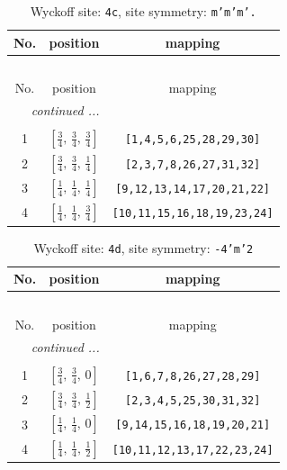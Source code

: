 \documentclass[fleqn,8pt]{jsarticle}
\begin{document}
\renewcommand{\arraystretch}{1.2}
\begin{longtable}{ccc}
\caption{Wyckoff site: {\tt 4c}, site symmetry: {\tt m'm'm'.}}
 \\
 \hline \hline
No. & position & mapping \\ \hline \endfirsthead

\multicolumn{2}{l}{\tablename\ \thetable{}} \\
 \hline \hline
No. & position & mapping \\ \hline \endhead

 \hline \hline
\multicolumn{2}{r}{\footnotesize\it continued ...} \\ \endfoot

 \hline \hline
\multicolumn{2}{r}{} \\ \endlastfoot

1 & $\left[ \frac{3}{4},\, \frac{3}{4},\, \frac{3}{4} \right]$ & {\tt [1,4,5,6,25,28,29,30]} \\ \hline
2 & $\left[ \frac{3}{4},\, \frac{3}{4},\, \frac{1}{4} \right]$ & {\tt [2,3,7,8,26,27,31,32]} \\ \hline
3 & $\left[ \frac{1}{4},\, \frac{1}{4},\, \frac{1}{4} \right]$ & {\tt [9,12,13,14,17,20,21,22]} \\ \hline
4 & $\left[ \frac{1}{4},\, \frac{1}{4},\, \frac{3}{4} \right]$ & {\tt [10,11,15,16,18,19,23,24]} \\
\end{longtable}
\renewcommand{\arraystretch}{1.2}
\begin{longtable}{ccc}
\caption{Wyckoff site: {\tt 4d}, site symmetry: {\tt -4'm'2}}
 \\
 \hline \hline
No. & position & mapping \\ \hline \endfirsthead

\multicolumn{2}{l}{\tablename\ \thetable{}} \\
 \hline \hline
No. & position & mapping \\ \hline \endhead

 \hline \hline
\multicolumn{2}{r}{\footnotesize\it continued ...} \\ \endfoot

 \hline \hline
\multicolumn{2}{r}{} \\ \endlastfoot

1 & $\left[ \frac{3}{4},\, \frac{3}{4},\, 0 \right]$ & {\tt [1,6,7,8,26,27,28,29]} \\ \hline
2 & $\left[ \frac{3}{4},\, \frac{3}{4},\, \frac{1}{2} \right]$ & {\tt [2,3,4,5,25,30,31,32]} \\ \hline
3 & $\left[ \frac{1}{4},\, \frac{1}{4},\, 0 \right]$ & {\tt [9,14,15,16,18,19,20,21]} \\ \hline
4 & $\left[ \frac{1}{4},\, \frac{1}{4},\, \frac{1}{2} \right]$ & {\tt [10,11,12,13,17,22,23,24]} \\
\end{longtable}
\end{document}
